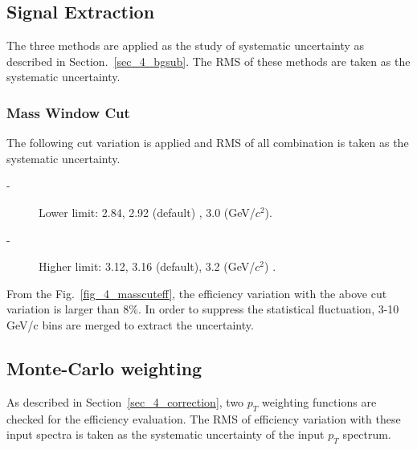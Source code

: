 \subsection{Signal Extraction}
The three methods are applied as the study of systematic uncertainty as described in Section.~\ref{sec_4_bgsub}.
The RMS of these methods are taken as the systematic uncertainty. 

\subsubsection{Mass Window Cut}
The following cut variation is applied and RMS of all combination is taken as the systematic uncertainty. 
\begin{description}
  \item[-] Lower limit: 2.84, 2.92 (default) , 3.0 (GeV/$c^{2}$).
  \item[-] Higher limit: 3.12, 3.16 (default), 3.2 (GeV/$c^{2}$) .
\end{description}
From the Fig.~\ref{fig_4_masscuteff}, the efficiency variation with the above cut variation is larger than 8\%.
In order to suppress the statistical fluctuation, 3-10 GeV/c bins are merged to extract the uncertainty. 



\subsection{Monte-Carlo weighting}
As described in Section~\ref{sec_4_correction}, two $p_{T}$ weighting functions are checked for the efficiency evaluation. 
The RMS of efficiency variation with these input spectra is taken as the systematic uncertainty of the input $p_{T}$ spectrum.  

